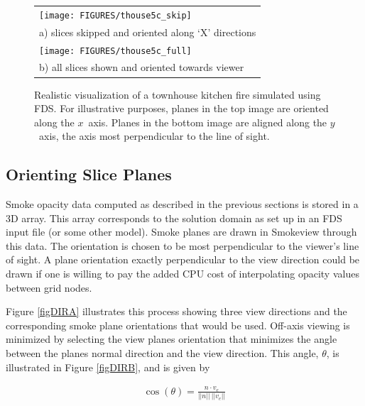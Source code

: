 {\begin{figure}[\figoptions]
\begin{center}
\begin{tabular}{l}
\texttt{[image: FIGURES/thouse5c\_skip]}\\
a) slices skipped and oriented along `X' directions\\
\texttt{[image: FIGURES/thouse5c\_full]}\\
b) all slices shown and oriented towards viewer \\
\end{tabular}
\end{center}
\caption[Realistic visualization of a townhouse kitchen fire
simulated using FDS.]{Realistic visualization of a townhouse
kitchen fire simulated using FDS. For illustrative purposes,
planes in the top image are oriented along the $x$~axis.  Planes
in the bottom image are aligned along the $y$~axis, the axis most
perpendicular to the line of sight.}
\label{figsmoke3d}%
\end{figure}


\subsection{Orienting Slice Planes}

Smoke opacity data computed as described in the previous sections is stored in a 3D array. This array corresponds to the solution domain as set up in an FDS input file (or some other model). Smoke planes are drawn in Smokeview through this data.  The orientation is chosen to be most perpendicular to the viewer's line of sight. A plane orientation exactly perpendicular to the view direction could be drawn if one is willing to pay the added CPU cost of interpolating opacity values between grid nodes.

Figure \ref{figDIRA} illustrates this process showing three view directions and the corresponding smoke plane orientations that would be used. Off-axis viewing is minimized by selecting the view planes orientation that minimizes the angle between the planes normal direction and the view direction. This angle, $\theta$, is illustrated in Figure \ref{figDIRB}, and is given by

\begin{eqnarray}
\cos(\theta)=\frac{n\cdot v_e}{||n||~||v_e||}
\end{eqnarray}

}
